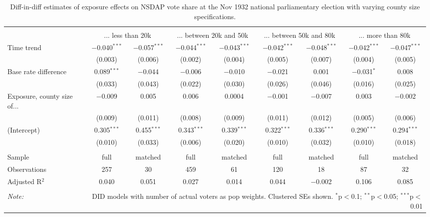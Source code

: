 
\begin{table}[!htbp] \centering 
  \caption{Diff-in-diff estimates of exposure effects on NSDAP vote share at the Nov 1932 national parliamentary election with varying county size specifications.\vspace{-.25cm}} 
  \label{tab:nsdap-voteshare-countysize-dd-1932-2} 
\scriptsize 
\begin{tabular}{@{\extracolsep{5pt}}lcccccccc} 
\\[-1.8ex]\hline 
\hline \\[-1.8ex] 
 & \multicolumn{2}{c}{... less than 20k } & \multicolumn{2}{c}{... between 20k and 50k} & \multicolumn{2}{c}{... between 50k and 80k} & \multicolumn{2}{c}{... more than 80k} \\ 
 \cmidrule(r){2-3}\cmidrule(r){4-5}\cmidrule(r){6-7}\cmidrule(r){8-9}Time trend & $-$0.040$^{***}$ & $-$0.057$^{***}$ & $-$0.044$^{***}$ & $-$0.043$^{***}$ & $-$0.042$^{***}$ & $-$0.048$^{***}$ & $-$0.042$^{***}$ & $-$0.047$^{***}$ \\ 
  & (0.003) & (0.006) & (0.002) & (0.004) & (0.005) & (0.007) & (0.004) & (0.005) \\ 
  Base rate difference & 0.089$^{***}$ & $-$0.044 & $-$0.006 & $-$0.010 & $-$0.021 & 0.001 & $-$0.031$^{*}$ & 0.008 \\ 
  & (0.033) & (0.043) & (0.022) & (0.030) & (0.026) & (0.046) & (0.016) & (0.025) \\ 
  Exposure, county size of... & $-$0.009 & 0.005 & 0.006 & 0.0004 & $-$0.001 & $-$0.007 & 0.003 & $-$0.002 \\ 
  & (0.009) & (0.011) & (0.008) & (0.009) & (0.011) & (0.012) & (0.005) & (0.006) \\ 
  (Intercept) & 0.305$^{***}$ & 0.455$^{***}$ & 0.343$^{***}$ & 0.339$^{***}$ & 0.322$^{***}$ & 0.336$^{***}$ & 0.290$^{***}$ & 0.294$^{***}$ \\ 
  & (0.010) & (0.033) & (0.006) & (0.020) & (0.010) & (0.032) & (0.010) & (0.018) \\ 
 \hline \\[-1.8ex] 
Sample & full & matched & full & matched & full & matched & full & matched \\ 
Observations & 257 & 30 & 459 & 61 & 120 & 18 & 87 & 32 \\ 
Adjusted R$^{2}$ & 0.040 & 0.051 & 0.027 & 0.014 & 0.044 & $-$0.002 & 0.106 & 0.085 \\ 
\hline 
\hline \\[-1.8ex] 
\textit{Note:}  & \multicolumn{8}{r}{DID models with number of actual voters as pop weights. Clustered SEs shown. $^{*}$p$<$0.1; $^{**}$p$<$0.05; $^{***}$p$<$0.01} \\ 
\end{tabular} 
\end{table} 
